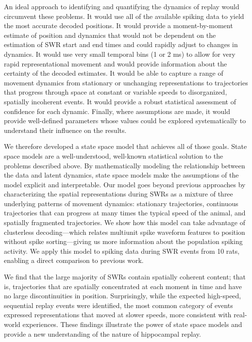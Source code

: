 \documentclass[9pt,lineno]{elife}
\begin{document}
An ideal approach to identifying and quantifying the dynamics of replay would circumvent these problems. It would use all of the available spiking data to yield the most accurate decoded positions. It would provide a moment-by-moment estimate of position and dynamics that would not be dependent on the estimation of SWR start and end times and could rapidly adjust to changes in dynamics. It would use very small temporal bins (1 or 2 ms) to allow for very rapid representational movement and would provide information about the certainty of the decoded estimates. It would be able to capture a range of movement dynamics from stationary or unchanging representations to trajectories that progress through space at constant or variable speeds to disorganized, spatially incoherent events. It would provide a robust statistical assessment of confidence for each dynamic. Finally, where assumptions are made, it would provide well-defined parameters whose values could be explored systematically to understand their influence on the results.

We therefore developed a state space model that achieves all of those goals. State space models are a well-understood, well-known statistical solution to the problems described above. By mathematically modeling the relationship between the data and latent dynamics, state space models make the assumptions of the model explicit and interpretable. Our model goes beyond previous approaches \citep{MaboudiUncoveringtemporalstructure2018, DengRapidclassificationhippocampal2016} by characterizing the spatial representations during SWRs as a mixture of three underlying patterns of movement dynamics: stationary trajectories, continuous trajectories that can progress at many times the typical speed of the animal, and spatially fragmented trajectories. We show how this model can take advantage of clusterless decoding---which relates multiunit spike waveform features to position without spike sorting---giving us more information about the population spiking activity. We apply this model to spiking data during SWR events from 10 rats, enabling a direct comparison to previous work.

We find that the large majority of SWRs contain spatially coherent content; that is, trajectories that are spatially concentrated at each moment in time and have no large discontinuities in position. Surprisingly, while the expected high-speed, sequential replay events were identified, the most common category of events expressed representations that moved at slower speeds, more consistent with real-world experiences. These findings illustrate the power of state space models and provide a new understanding of the nature of hippocampal replay.
\end{document}
